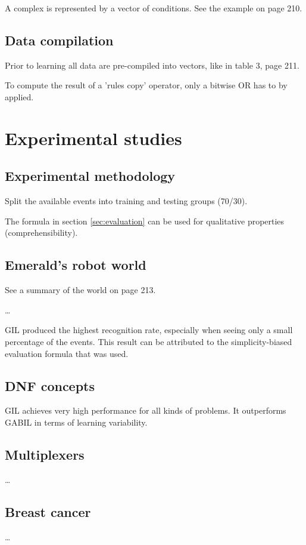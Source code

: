 \documentclass[12pt]{book}
\newcounter{subsubsubsection}[subsubsection]
\begin{document}
A complex is represented by a vector of conditions. See the example on page 210.

\subsection{Data compilation}
Prior to learning all data are pre-compiled into vectors, like in table 3, page 211.

To compute the result of a 'rules copy' operator, only a bitwise OR has to by applied.

\section{Experimental studies}
\subsection{Experimental methodology}
Split the available events into training and testing groups (70/30).

The formula in section \ref{sec:evaluation} can be used for qualitative properties (comprehensibility).

\subsection{Emerald's robot world}
See a summary of the world on page 213.

\dots

GIL produced the highest recognition rate, especially when seeing only a small percentage of the events. This result can be attributed to the simplicity-biased evaluation formula that was used.

\subsection{DNF concepts}
GIL achieves very high performance for all kinds of problems. It outperforms GABIL in terms of learning variability.

\subsection{Multiplexers}
\dots

\subsection{Breast cancer}
\dots
\end{document}
